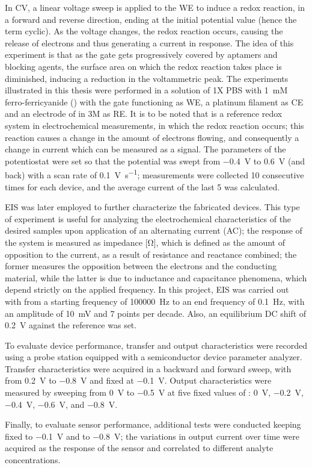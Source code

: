 In CV, a linear voltage sweep is applied to the WE to induce a redox reaction,
in a forward and reverse direction, ending at the initial potential value (hence
the term cyclic). As the voltage changes, the redox reaction occurs, causing the
release of electrons and thus generating a current in response. The idea of this
experiment is that as the gate gets progressively covered by aptamers and
blocking agents, the surface area on which the redox reaction takes place is
diminished, inducing a reduction in the voltammetric peak. The experiments
illustrated in this thesis were performed in a solution of 1X PBS with
\SI{1}{mM} ferro-ferricyanide () with the gate
functioning as WE, a platinum filament as CE and an electrode of  in
3M  as RE. It is to be noted that  is a
reference redox system in electrochemical measurements, in which the redox
reaction  occurs; this reaction causes a
change in the amount of electrons flowing, and consequently a change in current
which can be measured as a signal. The parameters of the potentiostat were set
so that the potential was swept from \SI{-0.4}{V} to \SI{+0.6}{V} (and back)
with a scan rate of \SI{0.1}{\V\per\s}; measurements were collected 10
consecutive times for each device, and the average current of the last 5 was
calculated.

EIS was later employed to further characterize the fabricated devices. This type
of experiment is useful for analyzing the electrochemical characteristics of the
desired samples upon application of an alternating current (AC); the response of
the system is measured as impedance [\unit{\ohm}], which is defined as the
amount of opposition to the current, as a result of resistance and reactance
combined; the former measures the opposition between the electrons and the
conducting material, while the latter is due to inductance and capacitance
phenomena, which depend strictly on the applied frequency. In this project, EIS
was carried out with from a starting frequency of \SI{100000}{\hertz} to an end
frequency of \SI{0.1}{\hertz}, with an amplitude of \SI{10}{mV} and 7 points per
decade. Also, an equilibrium DC shift of \SI{0.2}{V} against the reference was
set.

To evaluate device performance, transfer and output characteristics were
recorded using a probe station equipped with a semiconductor device parameter
analyzer. Transfer characteristics were acquired in a backward and forward
sweep, with \vgs{} from \SI{0.2}{\V} to \SI{-0.8}{\V} and \vds{} fixed at
\SI{-0.1}{\V}. Output characteristics were measured by sweeping \vds{} from
\SI{0}{\volt} to \SI{-0.5}{\volt} at five fixed values of \vgs{}: \SI{0}{\V},
\SI{-0.2}{\V}, \SI{-0.4}{\V}, \SI{-0.6}{\V}, and \SI{-0.8}{\V}.

Finally, to evaluate sensor performance, additional tests were conducted keeping
\vds{} fixed to \SI{-0.1}{\V} and \vgs{} to \SI{-0.8}{\V}; the variations in
output current over time were acquired as the response of the sensor and
correlated to different analyte concentrations.
